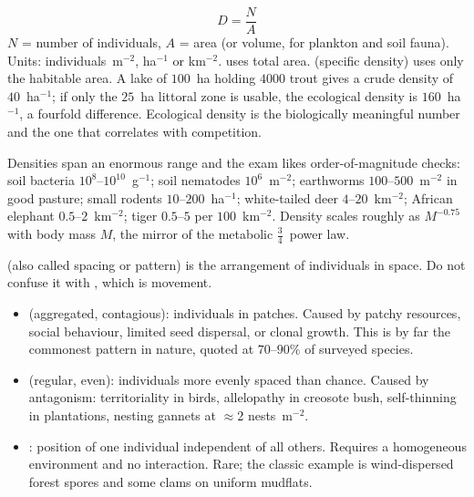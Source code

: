 \begin{keybox}[title={MEMORIZE: density and its two flavours}]
\[
D=\frac{N}{A}
\]
$N$ = number of individuals, $A$ = area (or volume, for plankton and soil fauna).
Units: individuals~m$^{-2}$, ha$^{-1}$ or km$^{-2}$.
 uses total area.  (specific density)
uses only the habitable area. A lake of $100$~ha holding $4000$ trout gives a
crude density of $40$~ha$^{-1}$; if only the $25$~ha littoral zone is usable, the
ecological density is $160$~ha$^{-1}$, a fourfold difference. Ecological density
is the biologically meaningful number and the one that correlates with
competition.
\end{keybox}

Densities span an enormous range and the exam likes order-of-magnitude checks:
soil bacteria $10^{8}$--$10^{10}$~g$^{-1}$; soil nematodes $10^{6}$~m$^{-2}$;
earthworms $100$--$500$~m$^{-2}$ in good pasture; small rodents
$10$--$200$~ha$^{-1}$; white-tailed deer $4$--$20$~km$^{-2}$; African elephant
$0.5$--$2$~km$^{-2}$; tiger $0.5$--$5$ per $100$~km$^{-2}$. Density scales roughly
as $M^{-0.75}$ with body mass $M$, the mirror of the metabolic
$\frac{3}{4}$~power law.

\begin{defbox}[title={DEFINITIONS: the three dispersion patterns}]
 (also called spacing or pattern) is the arrangement of
individuals in space. Do not confuse it with , which is movement.
\begin{itemize}
\item {} (aggregated, contagious): individuals in patches. Caused by
patchy resources, social behaviour, limited seed dispersal, or clonal growth.
This is by far the commonest pattern in nature, quoted at $70$--$90\%$ of
surveyed species.
\item {} (regular, even): individuals more evenly spaced than chance.
Caused by antagonism: territoriality in birds, allelopathy in creosote bush,
self-thinning in plantations, nesting gannets at $\approx 2$ nests~m$^{-2}$.
\item {}: position of one individual independent of all others. Requires
a homogeneous environment and no interaction. Rare; the classic example is
wind-dispersed forest spores and some clams on uniform mudflats.
\end{itemize}
\end{defbox}


